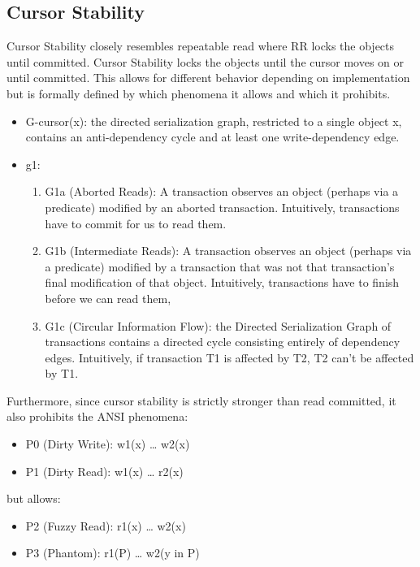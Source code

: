 \documentclass[a4paper,10pt,titlepage]{report}
\begin{document}
\subsection{Cursor Stability}
Cursor Stability closely resembles repeatable read where RR locks the objects until committed. Cursor Stability locks the objects until the cursor moves on or until committed. This allows for different behavior depending on implementation but is formally defined by which phenomena it allows and which it prohibits. \cite{Adya99weakconsistency}\\
\begin{itemize}
    \item G-cursor(x): the directed serialization graph, restricted to a single object x, contains an anti-dependency cycle and at least one write-dependency edge.
    \item g1:
    \begin{enumerate}
        \item G1a (Aborted Reads): A transaction observes an object (perhaps via a predicate) modified by an aborted transaction. Intuitively, transactions have to commit for us to read them.
        \item G1b (Intermediate Reads): A transaction observes an object (perhaps via a predicate) modified by a transaction that was not that transaction's final modification of that object. Intuitively, transactions have to finish before we can read them,
        \item G1c (Circular Information Flow): the Directed Serialization Graph of transactions contains a directed cycle consisting entirely of dependency edges. Intuitively, if transaction T1 is affected by T2, T2 can't be affected by T1.
    \end{enumerate}
\end{itemize}
Furthermore, since cursor stability is strictly stronger than read committed, it also prohibits the ANSI phenomena:
\begin{itemize}
    \item P0 (Dirty Write): w1(x) … w2(x)
    \item P1 (Dirty Read): w1(x) … r2(x)
\end{itemize}

but allows:
\begin{itemize}
    \item P2 (Fuzzy Read): r1(x) … w2(x)
    \item P3 (Phantom): r1(P) … w2(y in P)
\end{itemize}
\end{document}
